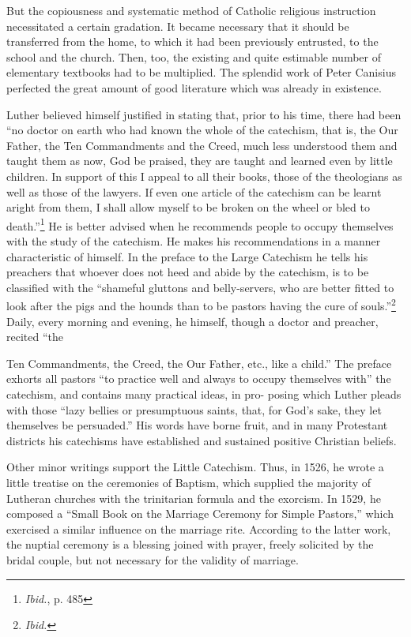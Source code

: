 But the
copiousness and systematic method of Catholic religious instruction
necessitated a certain gradation. It became necessary that it should be
transferred from the home, to which it had been previously entrusted,
to the school and the church. Then, too, the existing and quite estimable
number of elementary textbooks had to be multiplied. The
splendid work of Peter Canisius perfected the great amount of good
literature which was already in existence.

Luther believed himself justified in stating that, prior to his time, there
had been “no doctor on earth who had known the whole of the catechism,
that is, the Our Father, the Ten Commandments and the Creed, much less
understood them and taught them as now, God be praised, they are taught
and learned even by little children. In support of this I appeal to all their
books, those of the theologians as well as those of the lawyers. If even one
article of the catechism can be learnt aright from them, I shall allow myself
to be broken on the wheel or bled to death.”\footnote{\textit{Ibid.}, p. 485}
 He is better advised when he
recommends people to occupy themselves with the study of the catechism. He
makes his recommendations in a manner characteristic of himself. In the
preface to the Large Catechism he tells his preachers that whoever does not
heed and abide by the catechism, is to be classified with the “shameful
gluttons and belly-servers, who are better fitted to look after the pigs and
the hounds than to be pastors having the cure of souls.”\footnote{\textit{Ibid.}}
 Daily, every
morning and evening, he himself, though a doctor and preacher, recited “the

Ten Commandments, the Creed, the Our Father, etc., like a child.” The
preface exhorts all pastors “to practice well and always to occupy
themselves with” the catechism, and contains many practical ideas, in pro-
posing which Luther pleads with those “lazy bellies or presumptuous saints,
that, for God’s sake, they let themselves be persuaded.” His words have borne
fruit, and in many Protestant districts his catechisms have established and
sustained positive Christian beliefs.

Other minor writings support the Little Catechism. Thus, in 1526,
he wrote a little treatise on the ceremonies of Baptism, which supplied
the majority of Lutheran churches with the trinitarian formula and
the exorcism. In 1529, he composed a “Small Book on the Marriage
Ceremony for Simple Pastors,” which exercised a similar influence on
the marriage rite. According to the latter work, the nuptial ceremony
is a blessing joined with prayer, freely solicited by the bridal couple,
but not necessary for the validity of marriage.

